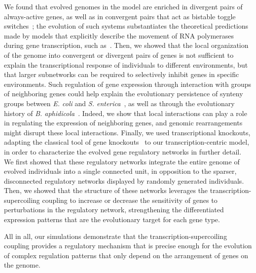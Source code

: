 We found that evolved genomes in the model are enriched in divergent pairs of always-active genes, as well as in convergent pairs that act as bistable toggle switches~\citep{gardner2000,johnstone2022}; the evolution of such systems substantiates the theoretical predictions made by models that explicitly describe the movement of RNA polymerases during gene transcription, such as~\cite{sevier2021}.
Then, we showed that the local organization of the genome into convergent or divergent pairs of genes is not sufficient to explain the transcriptional response of individuals to different environments, but that larger subnetworks can be required to selectively inhibit genes in specific environments.
Such regulation of gene expression through interaction with groups of neighboring genes could help explain the evolutionary persistence of synteny groups between \emph{E. coli} and \emph{S. enterica}~\citep{junier2016}, as well as through the evolutionary history of \emph{B. aphidicola}~\citep{brinza2013}.
Indeed, we show that local interactions can play a role in regulating the expression of neighboring genes, and genomic rearrangements might disrupt these local interactions.
Finally, we used transcriptional knockouts, adapting the classical tool of gene knockouts~\citep{baba2006} to our transcription-centric model, in order to characterize the evolved gene regulatory networks in further detail.
We first showed that these regulatory networks integrate the entire genome of evolved individuals into a single connected unit, in opposition to the sparser, disconnected regulatory networks displayed by randomly generated individuals.
Then, we showed that the structure of these networks leverages the transcription-supercoiling coupling to increase or decrease the sensitivity of genes to perturbations in the regulatory network, strengthening the differentiated expression patterns that are the evolutionary target for each gene type.

All in all, our simulations demonstrate that the transcription-supercoiling coupling provides a regulatory mechanism that is precise enough for the evolution of complex regulation patterns that only depend on the arrangement of genes on the genome.

